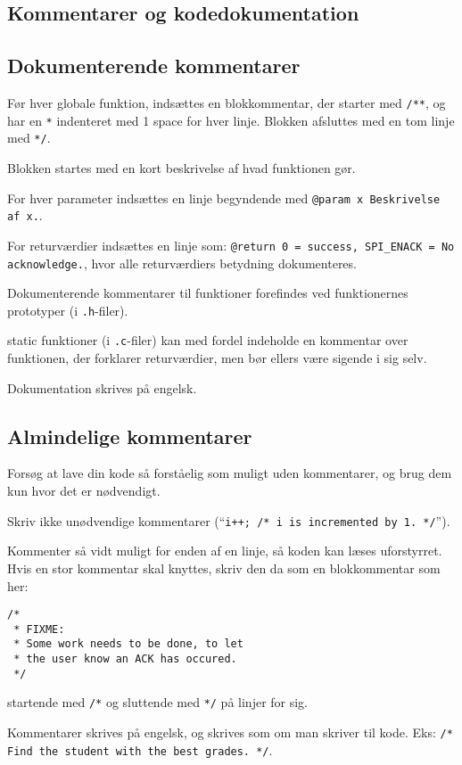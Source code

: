 \documentclass[article, 10pt]{memoir}
\let\tempone\itemize
\let\temptwo\enditemize
\renewenvironment{itemize}{\tempone\firmlist}{\temptwo}
\begin{document}
\begin{multicols}{2}
    \chapter{Kommentarer og kodedokumentation}

    \section{Dokumenterende kommentarer}
    \begin{itemize}
    \item Før hver globale funktion, indsættes en blokkommentar, der starter med \texttt{/**}, og har en \texttt{*} indenteret med 1 space for hver linje. Blokken afsluttes med en tom linje med \texttt{*/}.
    \item Blokken startes med en kort beskrivelse af hvad funktionen gør.
    \item For hver parameter indsættes en linje begyndende med \texttt{@param x Beskrivelse af x.}.
    \item For returværdier indsættes en linje som: \texttt{@return 0 = success, SPI\_ENACK = No acknowledge.}, hvor alle returværdiers betydning dokumenteres.
    \item Dokumenterende kommentarer til funktioner forefindes ved funktionernes prototyper (i \texttt{.h}-filer).
    \item static funktioner (i \texttt{.c}-filer) kan med fordel indeholde en kommentar over funktionen, der forklarer returværdier, men bør ellers være sigende i sig selv.
    \item Dokumentation skrives på engelsk.
    \end{itemize}

    \section{Almindelige kommentarer}
    \begin{itemize}
    \item Forsøg at lave din kode så forståelig som muligt uden kommentarer, og brug dem kun hvor det er nødvendigt.
    \item Skriv ikke unødvendige kommentarer (``\texttt{i++; /* i is incremented by 1. */}'').
    \item Kommenter så vidt muligt for enden af en linje, så koden kan læses uforstyrret. Hvis en stor kommentar skal knyttes, skriv den da som en blokkommentar som her:
        \begin{lstlisting}
/* 
 * FIXME:
 * Some work needs to be done, to let
 * the user know an ACK has occured. 
 */
        \end{lstlisting}
        startende med \texttt{/*} og sluttende med \texttt{*/} på linjer for sig.
    \item Kommentarer skrives på engelsk, og skrives som om man skriver til kode. Eks: \texttt{/* Find the student with the best grades. */}.
    \end{itemize}


\end{multicols}
\end{document}
